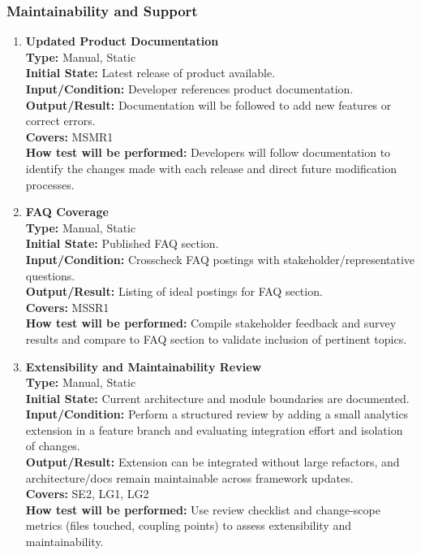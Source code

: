 \documentclass[12pt, titlepage]{article}
\begin{document}
\subsubsection{Maintainability and Support}
\begin{enumerate}[label=\bfseries MS-\arabic*:, wide=0pt]
  \item \label{test-MS1} \textbf{Updated Product Documentation}\\[2mm]
    {\bf Type:} Manual, Static\\
    {\bf Initial State:} Latest release of product available.\\
    {\bf Input/Condition:} Developer references product documentation.\\
    {\bf Output/Result:} Documentation will be followed to add new features or correct errors.\\
    {\bf Covers:} MSMR1\\
    {\bf How test will be performed:} Developers will follow documentation to identify the changes made with each release and direct future modification processes.

  \item \label{test-MS2} \textbf{FAQ Coverage}\\[2mm]
    {\bf Type:} Manual, Static\\
    {\bf Initial State:} Published FAQ section.\\
    {\bf Input/Condition:} Crosscheck FAQ postings with stakeholder/representative questions.\\
    {\bf Output/Result:} Listing of ideal postings for FAQ section.\\
    {\bf Covers:} MSSR1\\
    {\bf How test will be performed:} Compile stakeholder feedback and survey results and compare to FAQ section to validate inclusion of pertinent topics.

  \item \label{test-MS3} \textbf{Extensibility and Maintainability Review}\\[2mm]
    {\bf Type:} Manual, Static\\
    {\bf Initial State:} Current architecture and module boundaries are documented.\\
    {\bf Input/Condition:} Perform a structured review by adding a small analytics extension in a feature branch and evaluating integration effort and isolation of changes.\\
    {\bf Output/Result:} Extension can be integrated without large refactors, and architecture/docs remain maintainable across framework updates.\\
    {\bf Covers:} SE2, LG1, LG2\\
    {\bf How test will be performed:} Use review checklist and change-scope metrics (files touched, coupling points) to assess extensibility and maintainability.
\end{enumerate}
\end{document}
